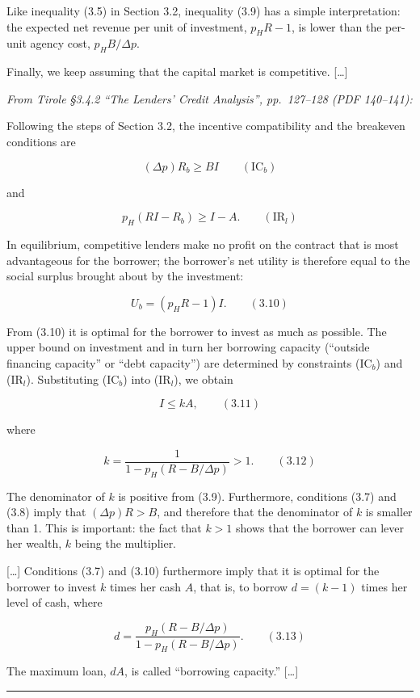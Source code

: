 \documentclass[11pt,a4paper]{article}
\newcommand{\stmtend}{\par\endgroup\nopagebreak\noindent\rule{\linewidth}{0.4pt}\par\medskip}
\begin{document}
Like inequality (3.5) in Section 3.2, inequality (3.9) has a simple interpretation: the expected net
revenue per unit of investment, \(p_H R - 1\), is lower than the per-unit agency cost,
\(p_H B/\Delta p\).

Finally, we keep assuming that the capital market is competitive. {[}\ldots{]}

\emph{From Tirole §3.4.2 ``The Lenders' Credit Analysis'', pp.~127--128 (PDF 140--141):}

Following the steps of Section 3.2, the incentive compatibility and the breakeven conditions are

\[(\Delta p) R_b \geqslant BI \qquad (\text{IC}_b)\]

and

\[p_H(RI - R_b) \geqslant I - A. \qquad (\text{IR}_l)\]

In equilibrium, competitive lenders make no profit on the contract that is most advantageous for the
borrower; the borrower's net utility is therefore equal to the social surplus brought about by the
investment:

\[U_b = (p_H R - 1) I. \qquad (3.10)\]

From (3.10) it is optimal for the borrower to invest as much as possible. The upper bound on
investment and in turn her borrowing capacity (``outside financing capacity'' or ``debt capacity'')
are determined by constraints (IC\(_b\)) and (IR\(_l\)). Substituting (IC\(_b\)) into (IR\(_l\)), we
obtain

\[I \leqslant kA, \qquad (3.11)\]

where

\[k = \frac{1}{1 - p_H(R - B/\Delta p)} > 1. \qquad (3.12)\]

The denominator of \(k\) is positive from (3.9). Furthermore, conditions (3.7) and (3.8) imply that
\((\Delta p)R > B\), and therefore that the denominator of \(k\) is smaller than 1. This is
important: the fact that \(k > 1\) shows that the borrower can lever her wealth, \(k\) being the
multiplier.

{[}\ldots{]} Conditions (3.7) and (3.10) furthermore imply that it is optimal for the borrower to
invest \(k\) times her cash \(A\), that is, to borrow \(d = (k - 1)\) times her level of cash, where

\[d = \frac{p_H(R - B/\Delta p)}{1 - p_H(R - B/\Delta p)}. \qquad (3.13)\]

The maximum loan, \(dA\), is called ``borrowing capacity.'' {[}\ldots{]}
\stmtend
\end{document}
